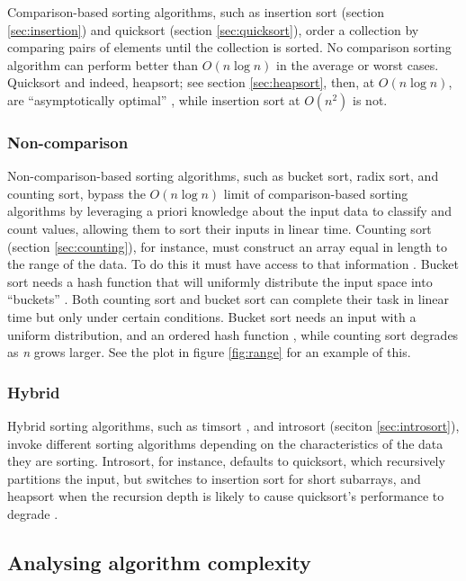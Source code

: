 \documentclass[12pt, a4paper]{article}
\begin{document}
Comparison-based sorting algorithms, such as insertion sort (section \ref{sec:insertion}) and quicksort (section \ref{sec:quicksort}), order a collection by comparing pairs of elements until the collection is sorted. No comparison sorting algorithm can perform better than $O(n\log n)$ in the average or worst cases. Quicksort and indeed, heapsort; see section \ref{sec:heapsort}, then, at $O(n\log n)$, are ``asymptotically optimal'' \autocite[165-168]{cormen01}, while insertion sort at $O(n^{2})$ is not.

\subsubsection{Non-comparison}

Non-comparison-based sorting algorithms, such as bucket sort, radix sort, and counting sort, bypass the $O(n\log n)$ limit of comparison-based sorting algorithms by leveraging a priori knowledge about the input data to classify and count values, allowing them to sort their inputs in linear time. Counting sort (section \ref{sec:counting}), for instance, must construct an array equal in length to the range of the data. To do this it must have access to that information \autocite[168]{cormen01}. Bucket sort needs a hash function that will uniformly distribute the input space into ``buckets'' \autocite[74]{heineman2016algorithms}. Both counting sort and bucket sort can complete their task in linear time but only under certain conditions. Bucket sort needs an input with a uniform distribution, and an ordered hash function \autocite[75]{heineman2016algorithms}, while counting sort degrades as \emph{n} grows larger. See the plot in figure \ref{fig:range} for an example of this.

\subsubsection{Hybrid}

Hybrid sorting algorithms, such as timsort \autocite{peters:timsort}, and introsort (seciton \ref{sec:introsort}), invoke different sorting algorithms depending on the characteristics of the data they are sorting. Introsort, for instance, defaults to quicksort, which recursively partitions the input, but switches to insertion sort for short subarrays, and heapsort when the recursion depth is likely to cause quicksort's performance to degrade \autocite{musser1997}.

\subsection{Analysing algorithm complexity}\label{sec:analysingcomplexity}
\end{document}
